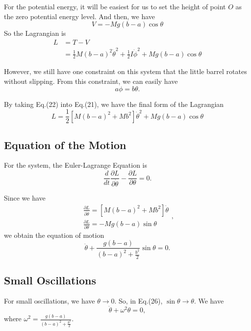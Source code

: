 \documentclass[%
 reprint,
 amsmath,amssymb,
 aps,
]{revtex4-1}
\begin{document}
For the potential energy, it will be easiest for us to set the height of point $O$ as the zero potential energy level. And then, we have
\begin{equation}
    V=-Mg(b-a)\cos{\theta}
\end{equation}
So the Lagrangian is 
\begin{equation}
\begin{aligned}
    L&=T-V\\
    &=\frac{1}{2}M(b-a)^2\dot{\theta}^2+\frac{1}{2}I\dot{\phi}^2+Mg(b-a)\cos{\theta}
\end{aligned}
\end{equation}

However, we still have one constraint on this system that the little barrel rotates without slipping. From this constraint, we can easily have 
\begin{equation}
    a\phi=b\theta.
\end{equation}

By taking Eq.(22) into Eq.(21), we have the final form of the Lagrangian
\begin{equation}
    L=\frac{1}{2}[M(b-a)^2+Mb^2]\dot{\theta}^2+Mg(b-a)\cos{\theta}
\end{equation}

\subsection{Equation of the Motion}
For the system, the Euler-Lagrange Equation is
\begin{equation}
    \frac{d}{dt}\frac{\partial L}{\partial \dot{\theta}}-\frac{\partial L}{\partial \theta}=0.
\end{equation}

Since we have
\begin{equation}
\begin{aligned}
\frac{\partial L}{\partial\dot{\theta}}=[M(b-a)^2+Mb^2]\dot{\theta}
\\\frac{\partial L}{\partial\theta}=-Mg(b-a)\sin{\theta}
\end{aligned},
\end{equation}
we obtain the equation of motion
\begin{equation}
  \ddot{\theta}+\frac{g(b-a)}{(b-a)^2+\frac{b^2}{2}}\sin{\theta}=0.
\end{equation}


\subsection{Small Oscillations}
For small oscillations, we have $\theta\rightarrow0$. So, in Eq.(26), $\sin{\theta}\rightarrow\theta$. We have
\begin{equation}
    \ddot{\theta}+\omega^2\theta=0,
\end{equation}
where $\omega^2=\frac{g(b-a)}{(b-a)^2+\frac{b^2}{2}}$.
\end{document}
